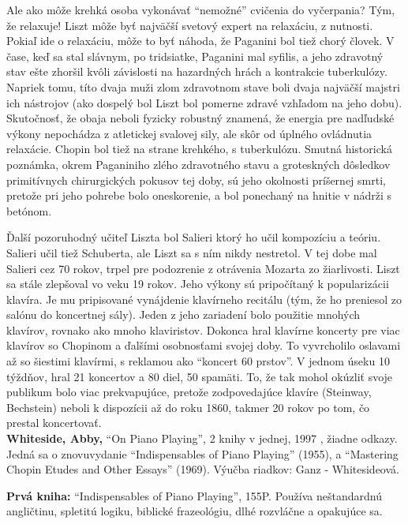 Ale ako môže krehká osoba vykonávať “nemožné” cvičenia do vyčerpania? Tým, že relaxuje! Liszt môže byť najväčší svetový expert na relaxáciu, z nutnosti. Pokiaľ ide o relaxáciu, môže to byť náhoda, že Paganini bol tiež chorý človek. V čase, keď sa stal slávnym, po tridsiatke, Paganini mal syfilis, a jeho zdravotný stav ešte zhoršil kvôli závislosti na hazardných hrách a kontrakcie tuberkulózy. Napriek tomu, títo dvaja muži zlom zdravotnom stave boli dvaja najväčší majstri ich nástrojov (ako dospelý bol Liszt bol pomerne zdravé vzhľadom na jeho dobu). Skutočnosť, že obaja neboli fyzicky robustný znamená, že energia pre nadľudské výkony nepochádza z atletickej svalovej sily, ale skôr od úplného ovládnutia relaxácie. Chopin bol tiež na strane krehkého, s tuberkulózu. Smutná historická poznámka, okrem Paganiniho zlého zdravotného stavu a groteskných dôsledkov primitívnych chirurgických pokusov tej doby, sú jeho okolnosti príšernej smrti, pretože pri jeho pohrebe bolo oneskorenie, a bol ponechaný na hnitie v nádrži s betónom. 

Ďalší pozoruhodný učiteľ Liszta bol Salieri ktorý ho učil kompozíciu a teóriu. Salieri učil tiež Schuberta, ale Liszt sa s ním nikdy nestretol. V tej dobe mal Salieri cez 70 rokov, trpel pre podozrenie z otrávenia Mozarta zo žiarlivosti. Liszt sa stále zlepšoval vo veku 19 rokov. Jeho výkony sú pripočítaný k popularizácii klavíra. Je mu pripisované vynájdenie klavírneho recitálu (tým, že ho preniesol zo salónu do koncertnej sály). Jeden z jeho zariadení bolo použitie mnohých klavírov, rovnako ako mnoho klaviristov. Dokonca hral klavírne koncerty pre viac klavírov so Chopinom a ďalšími osobnosťami svojej doby. To vyvrcholilo oslavami až so šiestimi klavírmi, s reklamou ako “koncert 60 prstov”. V jednom úseku 10 týždňov, hral 21 koncertov a 80 diel, 50 spamäti. To, že tak mohol okúzliť svoje publikum bolo viac prekvapujúce, pretože zodpovedajúce klavíre (Steinway, Bechstein) neboli k dispozícii až do roku 1860, takmer 20 rokov po tom, čo prestal koncertovať.
\medskip\\
\textbf{Whiteside, Abby}\textbf{,} “On Piano Playing”, 2 knihy v jednej, 1997 , žiadne odkazy. Jedná sa o znovuvydanie “Indispensables of Piano Playing” (1955), a “Mastering Chopin Etudes and Other Essays” (1969). Výučba riadkov: Ganz - Whitesideová. 

\textbf{Prvá kniha:} “Indispensables of Piano Playing”, 155P. Používa neštandardnú angličtinu, spletitú logiku, biblické frazeológiu, dlhé rozvláčne a opakujúce sa. 

